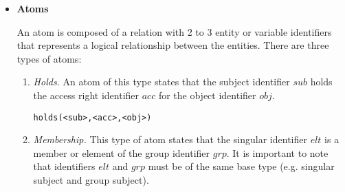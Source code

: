 \documentclass[11pt]{report}
\newenvironment{vverbatim}
{
  \begin{alltt}
}
{
    \vspace{-\baselineskip}
  \end{alltt}
}
\begin{document}
\begin{itemize}
\begin{enumerate}
                  \begin{vverbatim}
  [a-z][a-zA-Z0-9\_]
                  \end{vverbatim}
   
                \item
                  {\em Variable Identifiers} are used as place-holders for
                  entity identifiers. To distinguish them from entity and
                  policy update identifiers, variable identifiers are prefixed
                  with an upper-case character, followed by 0 or more
                  alphanumeric and underscore characters. The first character
                  of a variable identifier indicates its type ("S" for
                  subject, "A" for access right and "O" for object). If the
                  second character is an "S", then the variable is a
                  place-holder for a singular entity while a "G" indicates
                  that it is a place-holder for a group entity. The following
                  regular expression shows the syntax of variable identifiers:
   
                  \begin{vverbatim}
   [SAO][SG][a-zA-Z0-9\_]
                  \end{vverbatim}
              \end{enumerate}

            \item
              {\bf Atoms}

              An atom is composed of a relation with 2 to 3 entity or
              variable identifiers that represents a logical relationship
              between the entities. There are three types of atoms:

              \begin{enumerate}
                \item
                  {\em Holds.} An atom of this type states that the subject
                  identifier $sub$ holds the access right identifier $acc$
                  for the object identifier $obj$.

                 \begin{vverbatim}
  holds(<sub>, <acc>, <obj>)
                 \end{vverbatim}

                \item
                  {\em Membership.} This type of atom states that the
                  singular identifier $elt$ is a member or element of the
                  group identifier $grp$. It is important to note that
                  identifiers $elt$ and $grp$ must be of the same base type
                  (e.g. singular subject and group subject).


\end{enumerate}
\end{itemize}
\end{document}
